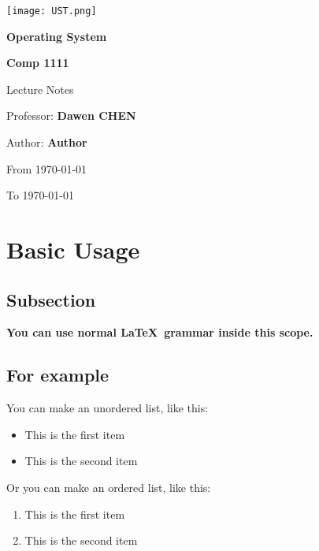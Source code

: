 \documentclass[12pt]{article}
\newcommand{\ClassName}{Operating System}
\newcommand{\Professor}{Dawen CHEN}
\newcommand{\ClassNum}{Comp 1111}
\newcommand{\Author}{Author}
\begin{document}
\begin{titlepage}
    \centering
    \texttt{[image: UST.png]}
    \par
    \vspace{1cm}
    {\Huge \bfseries \ClassName \par}
    {\Huge \bfseries \ClassNum \par}
    \vspace{1cm}
    {\Large Lecture Notes \par}
    \vspace{1cm}
    {\large Professor: \textbf{\Professor} \par}
    \vspace{0.5cm}
    {\large Author: \textbf{\Author} \par}
    \vfill
    {\large From \today \par}
    \vspace{0.5cm}
    {\large To \today \par}
\end{titlepage}

\tableofcontents
\newpage

\section{Basic Usage}
\subsection{Subsection}
\textbf{You can use normal \LaTeX\ grammar inside this scope.}

\subsection{For example}
You can make an unordered list, like this:
\begin{itemize}
    \item This is the first item
    \item This is the second item
\end{itemize}

Or you can make an ordered list, like this:
\begin{enumerate}
    \item This is the first item
    \item This is the second item
\end{enumerate}
\end{document}
